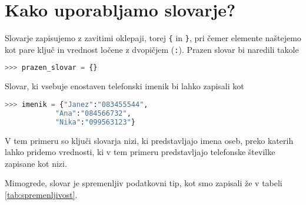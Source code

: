\section{Kako uporabljamo slovarje?}

Slovarje zapisujemo z zavitimi oklepaji, torej \texttt{\{} in \texttt{\}}, pri čemer elemente naštejemo kot pare ključ in vrednost ločene z dvopičjem (\texttt{:}). Prazen slovar bi naredili takole
\begin{lstlisting}[language=Python, showstringspaces=false]
>>> prazen_slovar = {}
\end{lstlisting}
Slovar, ki vsebuje enostaven telefonski imenik bi lahko zapisali kot
\begin{lstlisting}[language=Python, showstringspaces=false]
>>> imenik = {"Janez":"083455544", 
            "Ana":"084566732", 
            "Nika":"099563123"}
\end{lstlisting}
V tem primeru so ključi slovarja nizi, ki predstavljajo imena oseb, preko katerih lahko pridemo vrednosti, ki v tem primeru predstavljajo telefonske številke zapisane kot nizi. 

Mimogrede, slovar je spremenljiv podatkovni tip, kot smo zapisali že v tabeli \ref{tab:spremenljivost}.

